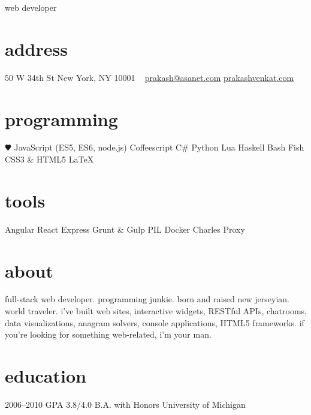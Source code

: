 \documentclass[]{friggeri-cv}
\begin{document}
       {web developer}


\begin{aside}
  \section{address}
    50 W 34th St
    New York, NY 10001
    ~
    \href{mailto:prakash@asanet.com}{prakash@asanet.com}
    \href{http://prakashvenkat.com}{prakashvenkat.com}
  \section{programming}
    {\color{red} $\varheartsuit$} JavaScript
    (ES5, ES6, node.js)
    Coffeescript
    C\#
    Python
    Lua
    Haskell
    Bash
    Fish
    CSS3 \& HTML5
    LaTeX
  \section{tools}
    Angular
    React
    Express
    Grunt \& Gulp
    PIL
    Docker
    Charles Proxy
\end{aside}

\section{about}
full-stack web developer. programming junkie. born and raised new jerseyian. world traveler. i've built web sites, interactive widgets,
RESTful APIs, chatrooms, data visualizations, anagram solvers, console applications, 
HTML5 frameworks. if you're looking for something web-related, i'm your man.

\section{education}

\begin{entrylist}
  \entry
    {2006–2010}
    {GPA 3.8/4.0}
    {B.A. with Honors}
    {University of Michigan}
\end{entrylist}
\end{document}
